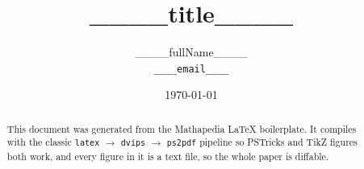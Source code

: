\documentclass[11pt]{article}
\title{____title____}
\author{____fullName____ \\ \texttt{____email____}}
\date{\today}
\begin{document}
\maketitle

\begin{abstract}
  This document was generated from the Mathapedia LaTeX boilerplate. It compiles
  with the classic \texttt{latex} $\rightarrow$ \texttt{dvips} $\rightarrow$
  \texttt{ps2pdf} pipeline so PSTricks and TikZ figures both work, and every
  figure in it is a text file, so the whole paper is diffable.
\end{abstract}

\tableofcontents







\end{document}
